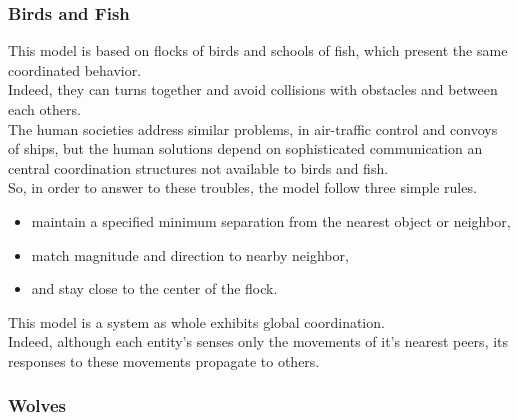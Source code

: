 \newpage

\subsubsection{Birds and Fish}

This model is based on flocks of birds and schools of fish, which present the same coordinated behavior.\\
Indeed, they can turns together and avoid collisions with obstacles and between each others.\\

The human societies address similar problems, in air-traffic control and convoys of ships, but the human solutions depend on sophisticated communication an central coordination structures not available to birds and fish.\\

So, in order to answer to these troubles, the model follow three simple rules.
\begin{itemize}
\item maintain a specified minimum separation from the nearest object or neighbor,
\item match magnitude and direction to nearby neighbor,
\item and stay close to the center of the flock.
\end{itemize}

This model is a system as whole exhibits global coordination.\\
Indeed, although each entity's senses only the movements of it's nearest peers, its responses to these movements propagate to others.\\



\newpage

\subsubsection{Wolves}

